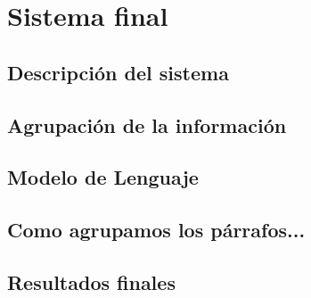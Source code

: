 \chapter{Sistema final}
\label{cap:sistemafinal}

\section{Descripción del sistema}

\section{Agrupación de la información}

\section{Modelo de Lenguaje}

\section{Como agrupamos los párrafos... }


\section{Resultados finales}